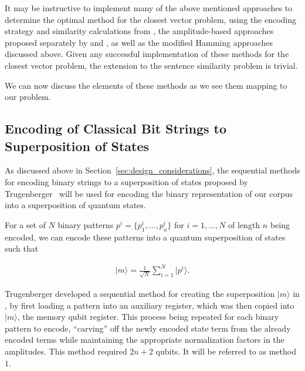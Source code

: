 It may be instructive to implement many of the above mentioned approaches to determine the optimal method for the closest vector problem, using the encoding strategy and similarity calculations from \cite{Trugenberger_2001,Trugenberger_2002}, the amplitude-based approaches proposed separately by \cite{Schuld_Sinayskiy_Petruccione_2014} and \cite{Wiebe_Kapoor_Svore_2014}, as well as the modified Hamming approaches discussed above. Given any successful implementation of these methods for the closest vector problem, the extension to the sentence similarity problem is trivial. 

We can now discuss the elements of these methods as we see them mapping to our problem.


\subsection{Encoding of Classical Bit Strings to Superposition of States}
\label{sec:encoding_trugenberger}
As discussed above in Section~\ref{sec:design_considerations}, the sequential methods for encoding binary strings to a superposition of states proposed by Trugenberger~\cite{Trugenberger_2001,Trugenberger_2002} will be used for encoding the binary representation of our corpus into a superposition of quantum states.

For a set of $N$ binary patterns $p^i = \{p_1^i, \dots, p_n^i \} $ for $i=1,\dots,N$ of length $n$ being encoded, we can encode these patterns into a quantum superposition of states such that

\begin{align}
    \label{eqn:superposition_state}
    \vert m \rangle = \frac{1}{\sqrt{N}}\sum\limits_{i=1}^ {N} \vert p^i \rangle.
\end{align}

Trugenberger developed a sequential method for creating the superposition $\vert m \rangle$ in \cite{Trugenberger_2001}, by first loading a pattern into an auxiliary register, which was then copied into $\vert m \rangle$, the memory qubit register. This process being repeated for each binary pattern to encode, ``carving'' off the newly encoded state term from the already encoded terms while maintaining the appropriate normalization factors in the amplitudes. This method required $2n + 2$ qubits. It will be referred to as method $1$. 

